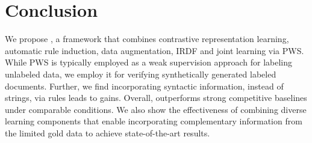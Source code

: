 \section{Conclusion}

We propose \our, a framework that combines contrastive representation learning, automatic rule induction, data augmentation, IRDF and joint learning via PWS. While PWS is typically employed as a weak supervision approach for labeling unlabeled data, we employ it for verifying synthetically generated labeled documents. Further, we find incorporating syntactic information, instead of strings, via rules leads to gains. Overall, \our outperforms strong competitive baselines under comparable conditions. We also show the effectiveness of combining diverse learning components that enable incorporating complementary information from the limited gold data to achieve state-of-the-art results.













